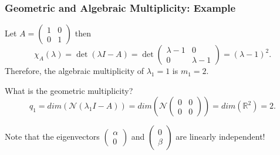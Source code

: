 \documentclass{beamer}
\begin{document}
\begin{frame}\frametitle{Geometric and Algebraic Multiplicity: Example}
	Let 
	$
		A = \begin{pmatrix}
	    		1 & 0 \\
	    		0 & 1
	  		\end{pmatrix}
	$ 
	then
	\[ 
		\chi_A(\lambda) 
			= \det(\lambda I - A) 
			= \det\begin{pmatrix}
	    			\lambda-1 & 0\\
					0 & \lambda-1
	  			   \end{pmatrix} 
	  		= (\lambda-1)^2. 
	\]
	Therefore, the algebraic multiplicity of $\lambda_1 = 1$ is $m_1 = 2$.
	
	What is the geometric multiplicity?
	\[ 
		q_1 = dim(\mathcal{N}(\lambda_1I-A)) 
			= dim\left(
				\mathcal{N}
					\begin{pmatrix}
	    				0 & 0\\
						0 & 0
	  				\end{pmatrix}
	  			\right) 
	  		= dim(\mathbb{R}^2) 
	  		= 2. 
	\]
	
	Note that the eigenvectors 
	$\begin{pmatrix}
	    \alpha \\ 0
	  \end{pmatrix}$ 
	and 
	$\begin{pmatrix}
	    0\\\beta
	  \end{pmatrix}$ 
	are linearly independent!
\end{frame}
\end{document}

